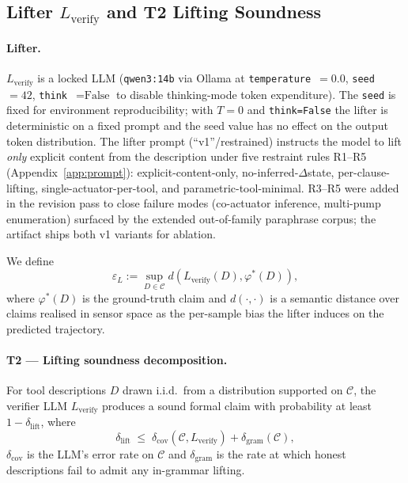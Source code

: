 \subsection{Lifter $L_{\text{verify}}$ and T2 Lifting Soundness}
\label{sec:design-lifter}

\paragraph{Lifter.}
$L_{\text{verify}}$ is a locked LLM (\texttt{qwen3:14b} via Ollama at
\texttt{temperature}~$=0.0$, \texttt{seed}~$=42$, \texttt{think}~$=
\text{False}$ to disable thinking-mode token expenditure). The
\texttt{seed} is fixed for environment reproducibility; with $T=0$
and \texttt{think=False} the lifter is deterministic on a fixed
prompt and the seed value has no effect on the output token
distribution. The lifter prompt (``v1''/restrained) instructs the
model to lift \emph{only} explicit content from the description under
five restraint rules R1--R5 (Appendix~\ref{app:prompt}):
explicit-content-only, no-inferred-$\Delta$state, per-clause-lifting,
single-actuator-per-tool, and parametric-tool-minimal. R3--R5 were
added in the revision pass to close failure modes (co-actuator
inference, multi-pump enumeration) surfaced by the extended
out-of-family paraphrase corpus; the artifact ships both v1 variants
for ablation.

We define
\[
\varepsilon_L := \sup_{D \in \mathcal{C}} d\!\left(L_{\text{verify}}(D),
                                                 \varphi^{*}(D)\right),
\]
where $\varphi^{*}(D)$ is the ground-truth claim and $d(\cdot, \cdot)$
is a semantic distance over claims realised in sensor space as the
per-sample bias the lifter induces on the predicted trajectory.

\paragraph{T2 --- Lifting soundness decomposition.}
\begin{theorem}
\label{thm:t2}
For tool descriptions $D$ drawn i.i.d.\ from a distribution supported
on $\mathcal{C}$, the verifier LLM $L_{\text{verify}}$ produces a
sound formal claim with probability at least
$1 - \delta_{\text{lift}}$, where
\[
\delta_{\text{lift}}
\;\leq\;
\delta_{\text{cov}}(\mathcal{C}, L_{\text{verify}})
+ \delta_{\text{gram}}(\mathcal{C}),
\]
$\delta_{\text{cov}}$ is the LLM's error rate on $\mathcal{C}$ and
$\delta_{\text{gram}}$ is the rate at which honest descriptions fail
to admit any in-grammar lifting.
\end{theorem}

